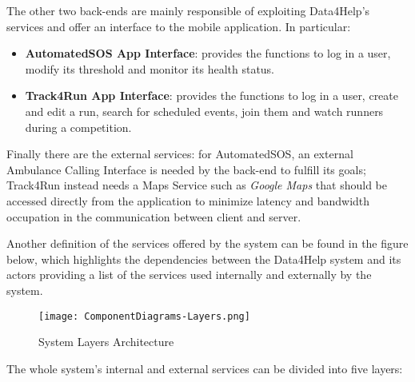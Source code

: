 The other two back-ends are mainly responsible of exploiting Data4Help's services and offer an interface to the mobile application. In particular:

\begin{itemize}
	\item \textbf{AutomatedSOS App Interface}: provides the functions to log in a user, modify its threshold and monitor its health status.
	\item \textbf{Track4Run App Interface}: provides the functions to log in a user, create and edit a run, search for scheduled events, join them and watch runners during a competition.
\end{itemize}

Finally there are the external services: for AutomatedSOS, an external Ambulance Calling Interface is needed by the back-end to fulfill its goals; Track4Run instead needs a Maps Service such as \textit{Google Maps} that should be accessed directly from the application to minimize latency and bandwidth occupation in the communication between client and server.

Another definition of the services offered by the system can be found in the figure below, which highlights the dependencies between the Data4Help system and its actors providing a list of the services used internally and externally by the system.

\FloatBarrier
\begin{figure}[!h]
	\centering
	\texttt{[image: ComponentDiagrams-Layers.png]}
	\caption{System Layers Architecture}
\end{figure}
\FloatBarrier

The whole system's internal and external services can be divided into five layers:


